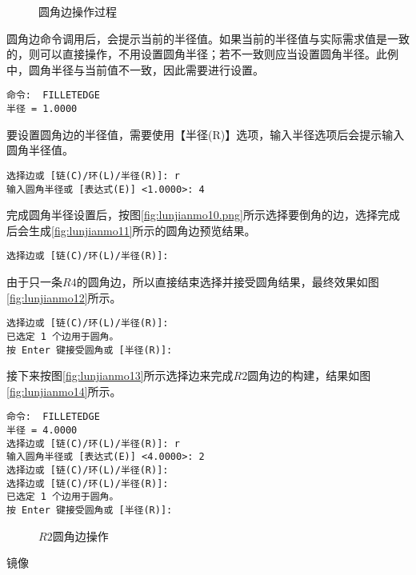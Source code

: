 \begin{procedure}
\begin{figure}[htbp]
\centering
{}\hspace{20pt}
\hspace{20pt}
\caption{圆角边操作过程}
\end{figure}

圆角边命令调用后，会提示当前的半径值。如果当前的半径值与实际需求值是一致的，则可以直接操作，不用设置圆角半径；若不一致则应当设置圆角半径。此例中，圆角半径与当前值不一致，因此需要进行设置。
\begin{lstlisting}
命令:  FILLETEDGE
半径 = 1.0000
\end{lstlisting}

要设置圆角边的半径值，需要使用【半径(R)】选项，输入半径选项后会提示输入圆角半径值。
\begin{lstlisting}
选择边或 [链(C)/环(L)/半径(R)]: r
输入圆角半径或 [表达式(E)] <1.0000>: 4
\end{lstlisting}
完成圆角半径设置后，按图\ref{fig:lunjianmo10.png}所示选择要倒角的边，选择完成后会生成\ref{fig:lunjianmo11}所示的圆角边预览结果。
\begin{lstlisting}
选择边或 [链(C)/环(L)/半径(R)]:
\end{lstlisting}

由于只一条$R4$的圆角边，所以直接结束选择并接受圆角结果，最终效果如图\ref{fig:lunjianmo12}所示。
\begin{lstlisting}
选择边或 [链(C)/环(L)/半径(R)]:
已选定 1 个边用于圆角。
按 Enter 键接受圆角或 [半径(R)]:
\end{lstlisting}

接下来按图\ref{fig:lunjianmo13}所示选择边来完成$R2$圆角边的构建，结果如图\ref{fig:lunjianmo14}所示。
\begin{lstlisting}
命令:  FILLETEDGE
半径 = 4.0000
选择边或 [链(C)/环(L)/半径(R)]: r
输入圆角半径或 [表达式(E)] <4.0000>: 2
选择边或 [链(C)/环(L)/半径(R)]:
选择边或 [链(C)/环(L)/半径(R)]:
已选定 1 个边用于圆角。
按 Enter 键接受圆角或 [半径(R)]:
\end{lstlisting}

\begin{figure}[htbp]
\centering
{}\hspace{40pt}
\caption{$R2$圆角边操作}
\end{figure}
\item 镜像


\end{procedure}

